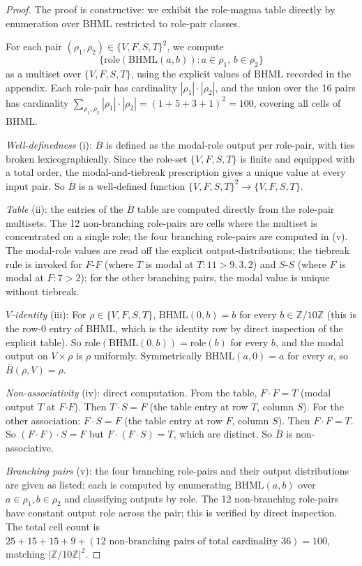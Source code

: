 \documentclass[11pt,reqno]{amsart}
\theoremstyle{plain}
\theoremstyle{definition}
\theoremstyle{remark}
\newcommand{\Z}{\mathbb{Z}}
\newcommand{\BH}{\mathrm{BHML}}
\newcommand{\Bbar}{\overline{B}}
\begin{document}
\begin{proof}
The proof is constructive: we exhibit the role-magma table directly
by enumeration over $\BH$ restricted to role-pair classes.

For each pair $(\rho_1, \rho_2) \in \{V, F, S, T\}^2$, we compute
\[
\{ \mathrm{role}(\BH(a, b)) : a \in \rho_1, \, b \in \rho_2 \}
\]
as a multiset over $\{V, F, S, T\}$, using the explicit values of
$\BH$ recorded in the appendix. Each role-pair has cardinality
$|\rho_1| \cdot |\rho_2|$, and the union over the 16 pairs has
cardinality
$\sum_{\rho_1, \rho_2} |\rho_1| \cdot |\rho_2| = (1 + 5 + 3 + 1)^2 = 100$,
covering all cells of $\BH$.

\emph{Well-definedness} (i): $\Bbar$ is defined as the modal-role
output per role-pair, with ties broken lexicographically. Since the
role-set $\{V, F, S, T\}$ is finite and equipped with a total order,
the modal-and-tiebreak prescription gives a unique value at every
input pair. So $\Bbar$ is a well-defined function
$\{V, F, S, T\}^2 \to \{V, F, S, T\}$.

\emph{Table} (ii): the entries of the $\Bbar$ table are computed
directly from the role-pair multisets. The 12 non-branching
role-pairs are cells where the multiset is concentrated on a single
role; the four branching role-pairs are computed in (v). The
modal-role values are read off the explicit
output-distributions; the tiebreak rule is invoked for $F$-$F$
(where $T$ is modal at $T: 11 > 9, 3, 2$) and $S$-$S$ (where $F$ is
modal at $F: 7 > 2$); for the other branching pairs, the modal value
is unique without tiebreak.

\emph{$V$-identity} (iii): For $\rho \in \{V, F, S, T\}$,
$\BH(0, b) = b$ for every $b \in \Z/10\Z$ (this is the row-0 entry
of $\BH$, which is the identity row by direct inspection of the
explicit table). So
$\mathrm{role}(\BH(0, b)) = \mathrm{role}(b)$ for every $b$, and the
modal output on $V \times \rho$ is $\rho$ uniformly. Symmetrically
$\BH(a, 0) = a$ for every $a$, so $\Bbar(\rho, V) = \rho$.

\emph{Non-associativity} (iv): direct computation. From the table,
$F \cdot F = T$ (modal output $T$ at $F$-$F$). Then
$T \cdot S = F$ (the table entry at row $T$, column $S$).
For the other association: $F \cdot S = F$ (the table entry at row
$F$, column $S$). Then $F \cdot F = T$. So
$(F \cdot F) \cdot S = F$ but $F \cdot (F \cdot S) = T$, which are
distinct. So $\Bbar$ is non-associative.

\emph{Branching pairs} (v): the four branching role-pairs and their
output distributions are given as listed; each is computed by
enumerating $\BH(a, b)$ over $a \in \rho_1, b \in \rho_2$ and
classifying outputs by role. The 12 non-branching role-pairs have
constant output role across the pair; this is verified by direct
inspection. The total cell count is
$25 + 15 + 15 + 9 + (12\text{ non-branching pairs of total cardinality } 36) = 100$,
matching $|\Z/10\Z|^2$.
\end{proof}
\end{document}
